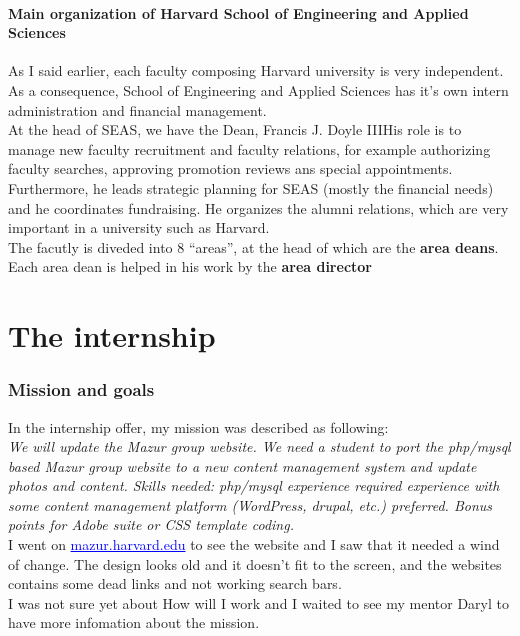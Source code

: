 \documentclass[10pt,a4paper]{article}
\newcommand{\seas}{School of Engineering and Applied Sciences}
\newcommand{\hseas}{Harvard School of Engineering and Applied Sciences}
\begin{document}
\subsection{Main organization of \hseas{}}
As I said earlier, each faculty composing Harvard university is very independent. As a consequence, \seas{} has it's own intern administration and financial management.\\
At the head of SEAS, we have the Dean, Francis J. Doyle III\@ His role is to manage new faculty recruitment and faculty relations, for example authorizing faculty searches, approving promotion reviews ans special appointments. Furthermore, he leads strategic planning for SEAS (mostly the financial needs) and he coordinates fundraising. He organizes the alumni relations, which are very important in a university such as Harvard.\\

The facutly is diveded into 8 ``areas'', at the head of which are the \textbf{area deans}.\\
Each area dean is helped in his work by the \textbf{area director}


\newpage
\part{The internship}

\section{Mission and goals}
In the internship offer, my mission was described as following:\\

\textit{We will update the Mazur group website. We need a student to port the php/mysql based Mazur group website to a new content management system and update photos and content.
Skills needed:
php/mysql experience required
experience with some content management platform (WordPress, drupal, etc.) preferred. Bonus points for Adobe suite or CSS template coding.}\\

I went on \textcolor{blue}{\underline{mazur.harvard.edu}} to see the website and I saw that it needed a wind of change. The design looks old and it doesn't fit to the screen, and the websites contains some dead links and not working search bars.\\
I was not sure yet about How will I work and I waited to see my mentor Daryl to have more infomation about the mission.\\
\end{document}
